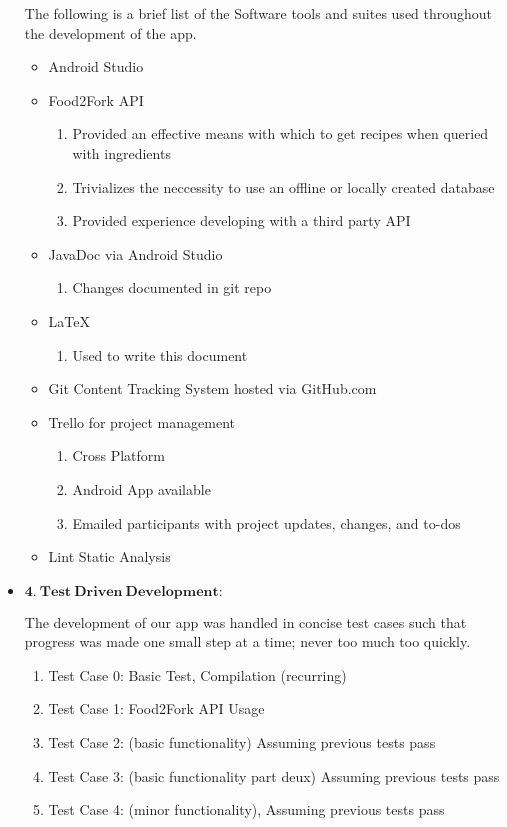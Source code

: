 \documentclass[a4paper,11pt]{article}
\begin{document}
\begin{itemize}
\parindent 30pt
The following is a brief list of the Software tools and suites used throughout the development of the app.
\begin{itemize}
\item Android Studio
\item Food2Fork API
	\begin{enumerate}
	\item Provided an effective means with which to get recipes when queried with ingredients
	\item Trivializes the neccessity to use an offline or locally created database
	\item Provided experience developing with a third party API
	\end{enumerate}
\item JavaDoc via Android Studio
	\begin{enumerate}
	\item Changes documented in git repo
	\end{enumerate}
\item LaTeX
	\begin{enumerate}
	\item Used to write this document
	\end{enumerate}
\item Git Content Tracking System hosted via GitHub.com
\item Trello for project management
	\begin{enumerate}
	\item Cross Platform
	\item Android App available
	\item Emailed participants with project updates, changes, and to-dos
	\end{enumerate}
\item Lint Static Analysis
\end{itemize}

\item $\mathbf{4.\ Test\ Driven\ Development:}$
\parindent 30pt

The development of our app was handled in concise test cases such that progress was made one small step at a time; never too much too quickly. \
\begin{enumerate}
\item Test Case 0: Basic Test, Compilation (recurring)
\item Test Case 1: Food2Fork API Usage
\item Test Case 2: (basic functionality) Assuming previous tests pass
\item Test Case 3: (basic functionality part deux) Assuming previous tests pass
\item Test Case 4: (minor functionality), Assuming previous tests pass
\end{enumerate}


\end{itemize}
\end{document}
